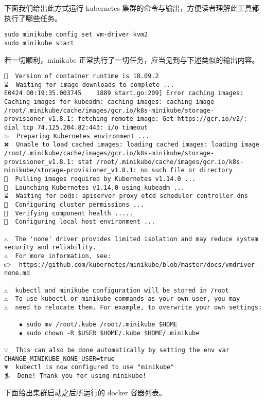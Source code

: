 下面我们给出此方式运行 kubernetes 集群的命令与输出，方便读者理解此工具都执行了哪些任务。

\begin{lstlisting}
sudo minikube config set vm-driver kvm2
sudo minikube start
\end{lstlisting}

若一切顺利，minikube 正常执行了一切任务，应当见到与下述类似的输出内容。

\begin{lstlisting}
🐳  Version of container runtime is 18.09.2
⌛  Waiting for image downloads to complete ...
E0424 00:19:35.003745    1889 start.go:209] Error caching images:  Caching images for kubeadm: caching images: caching image /root/.minikube/cache/images/gcr.io/k8s-minikube/storage-provisioner_v1.8.1: fetching remote image: Get https://gcr.io/v2/: dial tcp 74.125.204.82:443: i/o timeout
✨  Preparing Kubernetes environment ...
❌  Unable to load cached images: loading cached images: loading image /root/.minikube/cache/images/gcr.io/k8s-minikube/storage-provisioner_v1.8.1: stat /root/.minikube/cache/images/gcr.io/k8s-minikube/storage-provisioner_v1.8.1: no such file or directory
🚜  Pulling images required by Kubernetes v1.14.0 ...
🚀  Launching Kubernetes v1.14.0 using kubeadm ... 
⌛  Waiting for pods: apiserver proxy etcd scheduler controller dns
🔑  Configuring cluster permissions ...
🤔  Verifying component health .....
🤹  Configuring local host environment ...

⚠️  The 'none' driver provides limited isolation and may reduce system security and reliability.
⚠️  For more information, see:
👉  https://github.com/kubernetes/minikube/blob/master/docs/vmdriver-none.md

⚠️  kubectl and minikube configuration will be stored in /root
⚠️  To use kubectl or minikube commands as your own user, you may
⚠️  need to relocate them. For example, to overwrite your own settings:

    ▪ sudo mv /root/.kube /root/.minikube $HOME
    ▪ sudo chown -R $USER $HOME/.kube $HOME/.minikube

💡  This can also be done automatically by setting the env var CHANGE_MINIKUBE_NONE_USER=true
💗  kubectl is now configured to use "minikube"
🏄  Done! Thank you for using minikube!
\end{lstlisting}

下面给出集群启动之后所运行的 docker 容器列表。

